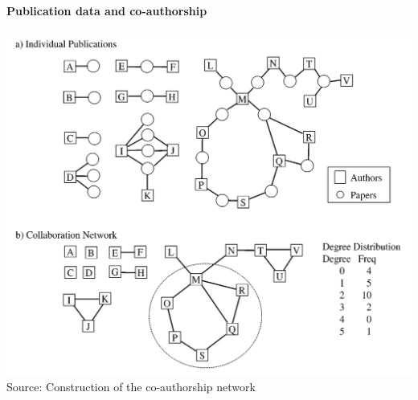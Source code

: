 \documentclass[8pt]{beamer}
\begin{document}
\begin{frame}
\frametitle{\insertsection}
\framesubtitle{Publication data and co-authorship}

\centering
\includegraphics[height=0.75\textheight]{construction}\\     
\tiny{Source: Construction of the co-authorship network \cite{Moody2004}}


\end{frame}

\end{document}
